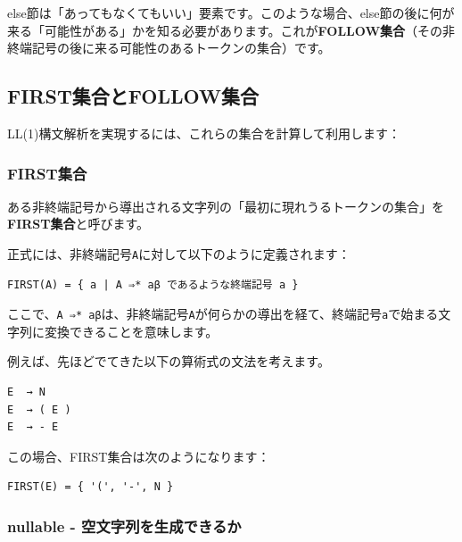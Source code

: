 else節は「あってもなくてもいい」要素です。このような場合、else節の後に何が来る「可能性がある」かを知る必要があります。これが\textbf{FOLLOW集合}（その非終端記号の後に来る可能性のあるトークンの集合）です。

\hypertarget{chapter5-firstux96c6ux5408ux3068followux96c6ux5408}{%
\subsection{FIRST集合とFOLLOW集合}\label{chapter5-firstux96c6ux5408ux3068followux96c6ux5408}}

LL(1)構文解析を実現するには、これらの集合を計算して利用します：

\hypertarget{chapter5-firstux96c6ux5408}{%
\subsubsection{FIRST集合}\label{chapter5-firstux96c6ux5408}}

ある非終端記号から導出される文字列の「最初に現れうるトークンの集合」を\textbf{FIRST集合}と呼びます。

正式には、非終端記号\texttt{A}に対して以下のように定義されます：

\begin{verbatim}
FIRST(A) = { a | A ⇒* aβ であるような終端記号 a }
\end{verbatim}

ここで、\texttt{A\ ⇒*\ aβ}は、非終端記号\texttt{A}が何らかの導出を経て、終端記号\texttt{a}で始まる文字列に変換できることを意味します。

例えば、先ほどでてきた以下の算術式の文法を考えます。

\begin{verbatim}
E  → N
E  → ( E )
E  → - E
\end{verbatim}

この場合、FIRST集合は次のようになります：

\begin{verbatim}
FIRST(E) = { '(', '-', N }
\end{verbatim}

\hypertarget{chapter5-nullable---ux7a7aux6587ux5b57ux5217ux3092ux751fux6210ux3067ux304dux308bux304b}{%
\subsubsection{nullable -
空文字列を生成できるか}\label{chapter5-nullable---ux7a7aux6587ux5b57ux5217ux3092ux751fux6210ux3067ux304dux308bux304b}}

